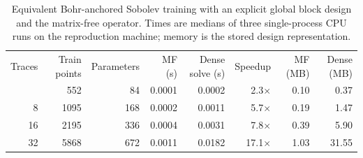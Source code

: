 \begin{table}[t]
\centering
\caption{Equivalent Bohr-anchored Sobolev training with an explicit global block design and the matrix-free operator. Times are medians of three single-process CPU runs on the reproduction machine; memory is the stored design representation.}\label{tab:real_benchmark}
\begin{ruledtabular}\begin{tabular}{rrrrrrrr}
Traces & Train points & Parameters & MF (s) & Dense solve (s) & Speedup & MF (MB) & Dense (MB) \\
\colrule
4 & 552 & 84 & 0.0001 & 0.0002 & 2.3$\times$ & 0.10 & 0.37 \\
8 & 1095 & 168 & 0.0002 & 0.0011 & 5.7$\times$ & 0.19 & 1.47 \\
16 & 2195 & 336 & 0.0004 & 0.0031 & 7.8$\times$ & 0.39 & 5.90 \\
32 & 5868 & 672 & 0.0011 & 0.0182 & 17.1$\times$ & 1.03 & 31.55 \\
\end{tabular}\end{ruledtabular}
\end{table}
